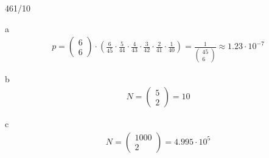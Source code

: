 \begin{exercise}{461/10}
  \item [a]
  \begin{gather*}
    p = \begin{pmatrix}6 \\ 6\end{pmatrix} \cdot (\frac{6}{45} \cdot \frac{5}{44} \cdot \frac{4}{43} \cdot \frac{3}{42} \cdot \frac{2}{41} \cdot \frac{1}{40}) = \frac{1}{\begin{pmatrix}45 \\ 6\end{pmatrix}} \approx 1.23 \cdot 10^{-7}
  \end{gather*}
  \item [b]
  \begin{gather*}
    N = \begin{pmatrix}5 \\ 2\end{pmatrix} = 10
  \end{gather*}
  \item [c]
  \begin{gather*}
    N = \begin{pmatrix}1000 \\ 2\end{pmatrix} = 4.995 \cdot 10^{5}
  \end{gather*}
\end{exercise}
